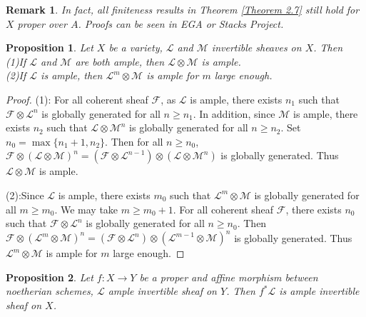 \documentclass{ctexart}
\newtheorem{remark}{Remark}[section]
\newtheorem{proposition}{Proposition}[section]
\begin{document}
\begin{remark}
    In fact, all finiteness results in Theorem \ref{Theorem 2.7} still hold for $X$ proper over $A$.
    Proofs can be seen in EGA or Stacks Project.
\end{remark}
\begin{proposition}
    Let $X$ be a variety, $\mathcal{L}$ and $\mathcal{M}$ invertible sheaves on $X$.
    Then \\
    (1)If $\mathcal{L}$ and $\mathcal{M}$ are both ample, then $\mathcal{L} \otimes \mathcal{M}$ is ample. \\
    (2)If $\mathcal{L}$ is ample, then $\mathcal{L}^{m} \otimes \mathcal{M}$ is ample for $m$ large enough.
    \label{Proposition 4.4}
\end{proposition}
\begin{proof}
    (1): For all coherent sheaf $\mathcal{F}$, as $\mathcal{L}$ is ample, 
    there exists $n_{1}$ such that $\mathcal{F} \otimes \mathcal{L}^{n}$ is globally generated for all $n \ge n_{1}$.
    In addition, since $\mathcal{M}$ is ample, there exists $n_{2}$ such that $\mathcal{L} \otimes \mathcal{M}^{n}$ is globally generated for all $n \ge n_{2}$.
    Set $n_{0} = \max \{n_{1} + 1, n_{2}\}$.
    Then for all $n \ge n_{0}$, $\mathcal{F} \otimes (\mathcal{L} \otimes \mathcal{M})^{n} = (\mathcal{F} \otimes \mathcal{L}^{n - 1}) \otimes (\mathcal{L} \otimes \mathcal{M}^{n})$ is globally generated.
    Thus $\mathcal{L} \otimes \mathcal{M}$ is ample.
    \par
    (2):Since $\mathcal{L}$ is ample, there exists $m_{0}$ such that $\mathcal{L}^{m} \otimes \mathcal{M}$ is globally generated for all $m \ge m_{0}$.
    We may take $m \ge m_{0} + 1$.
    For all coherent sheaf $\mathcal{F}$, there exists $n_{0}$ such that $\mathcal{F} \otimes \mathcal{L}^{n}$ is globally generated for all $n \ge n_{0}$.
    Then $\mathcal{F} \otimes (\mathcal{L}^{m} \otimes \mathcal{M})^{n} = (\mathcal{F} \otimes \mathcal{L}^{n}) \otimes (\mathcal{L}^{m - 1} \otimes \mathcal{M})^{n}$ is globally generated.
    Thus $\mathcal{L}^{m} \otimes \mathcal{M}$ is ample for $m$ large enough.
\end{proof}
\begin{proposition}
    Let $f: X \rightarrow Y$ be a proper and affine morphism between noetherian schemes, $\mathcal{L}$ ample invertible sheaf on $Y$.
    Then $f^{\ast}\mathcal{L}$ is ample invertible sheaf on $X$.
    \label{Proposition 4.5}
\end{proposition}
\end{document}
